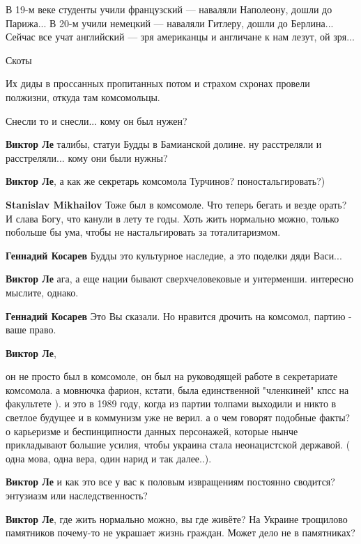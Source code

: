 \begin{itemize}

В 19-м веке студенты учили французский — наваляли Наполеону, дошли до Парижа...
В 20-м учили немецкий — наваляли Гитлеру, дошли до Берлина... Сейчас все учат
английский — зря американцы и англичане к нам лезут, ой зря...

Скоты

Их диды в проссанных пропитанных потом и страхом схронах провели полжизни, откуда там комсомольцы.

Снесли то и снесли... кому он был нужен?

\begin{itemize} %
\textbf{Виктор Ле} талибы, статуи Будды в Бамианской долине. ну расстреляли и расстреляли... кому они были нужны?

\textbf{Виктор Ле}, а как же секретарь комсомола Турчинов? поностальгировать?)

\textbf{Stanislav Mikhailov} Тоже был в комсомоле. Что теперь бегать и везде орать? И слава Богу, что канули в лету те годы. Хоть жить нормально можно, только побольше бы ума, чтобы не настальгировать за тоталитаризмом.

\textbf{Геннадий Косарев} Будды это культурное наследие, а это поделки дяди Васи...

\textbf{Виктор Ле} ага, а еще нации бывают сверхчеловековые и унтерменши. интересно мыслите, однако.

\textbf{Геннадий Косарев} Это Вы сказали. Но нравится дрочить на комсомол, партию - ваше право.

\textbf{Виктор Ле}, 

он не просто был в комсомоле, он был на руководящей работе в секретариате
комсомола. а мовнючка фарион, кстати, была единственной "членкиней" кпсс на
факультете ). и это в 1989 году, когда из партии толпами выходили и никто в
светлое будущее и в коммунизм уже не верил. а о чем говорят подобные факты? о
карьеризме и беспинципности данных персонажей, которые нынче прикладывают
большие усилия, чтобы украина стала неонацистской державой. ( одна мова, одна
вера, один нарид и так далее..).

\textbf{Виктор Ле} и как это все у вас к половым извращениям постоянно сводится? энтузиазм или наследственность?

\textbf{Виктор Ле}, где жить нормально можно, вы где живёте? На Украине трощилово памятников почему-то не украшает жизнь граждан. Может дело не в памятниках?


\end{itemize}
\end{itemize}

